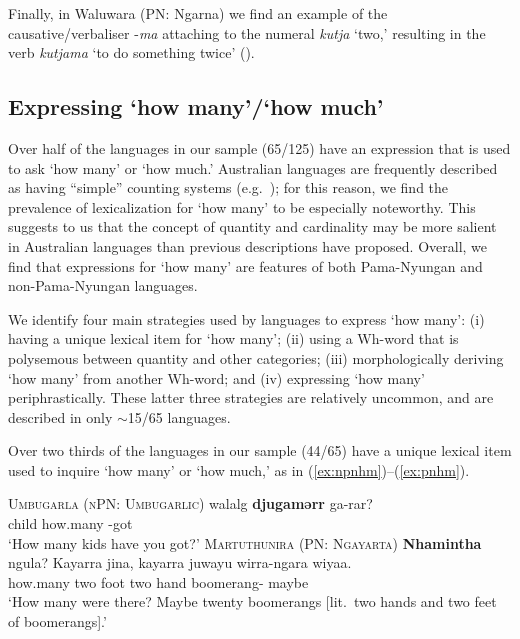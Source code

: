 \documentclass[12pt,egregdoesnotlikesansseriftitles]{scrartcl}
\newcommand{\ofy}{/125} %
\begin{document}
Finally, in Waluwara (PN: Ngarna) we find an example of the causative/verbaliser -\textit{\charis ma} attaching to the numeral \textit{\charis kutja} `two,' resulting in the verb \textit{\charis kutjama} `to do something twice' (\citealt[113]{breen71}).


\subsection{Expressing `how many'/`how much'
\label{sec:howmany}}

Over half of the languages in our sample (65\ofy) have an expression that is used to ask `how many' or `how much.' Australian languages are frequently described as having ``simple'' counting systems (e.g.\ \citealt[67]{dixon02}); for this reason, we find the prevalence  of lexicalization for `how many' to be especially noteworthy. This suggests to us that the concept of quantity and cardinality may be more salient in Australian languages than previous descriptions have proposed. Overall, we find that expressions for `how many' are features of both Pama-Nyungan and non-Pama-Nyungan languages.

We identify four main strategies used by languages to express `how many': (i) having a unique lexical item for `how many'; (ii) using a Wh-word that is polysemous between quantity and other categories; (iii) morphologically deriving `how many' from another Wh-word; and (iv) expressing `how many' periphrastically. These latter three strategies are relatively uncommon, and are described in only $\sim$15/65 languages. 

Over two thirds of the languages in our sample (44/65) have a unique lexical item used to inquire `how many' or `how much,' as in (\ref{ex:npnhm})--(\ref{ex:pnhm}). %


\begin{exe}
  \ex\label{ex:npnhm}\textsc{Umbugarla (nPN: Umbugarlic)}\hfill {}
  \gll walalg \textbf{djugamərr} ga-rar?\\
  child how.many \Ssg-got\\
  \glt `How many kids have you got?'
  \ex\label{ex:pnhm}\textsc{Martuthunira (PN: Ngayarta)}\hfill {}
  \gll \textbf{Nhamintha} ngula? Kayarra jina, kayarra juwayu wirra-ngara wiyaa.\\
  how.many \Ignor{} two foot two hand boomerang-\Pl{} maybe\\
  \glt `How many were there? Maybe twenty boomerangs [lit.\ two hands and two feet of boomerangs].'
\end{exe}
\end{document}
